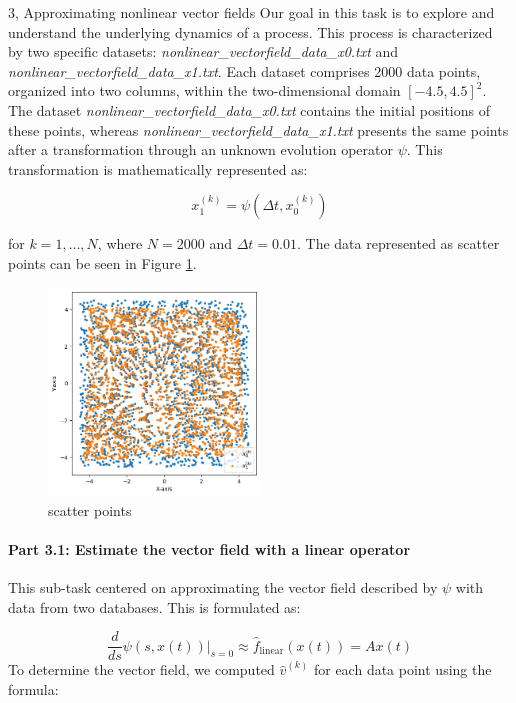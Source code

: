\begin{task}{3, Approximating nonlinear vector fields}
Our goal in this task is to explore and understand the underlying dynamics of a process. This process is characterized by two specific datasets: \textit{nonlinear\_vectorfield\_data\_x0.txt} and \textit{nonlinear\_vectorfield\_data\_x1.txt}. Each dataset comprises 2000 data points, organized into two columns, within the two-dimensional domain \([-4.5, 4.5]^2\). The dataset \textit{nonlinear\_vectorfield\_data\_x0.txt} contains the initial positions of these points, whereas \textit{nonlinear\_vectorfield\_data\_x1.txt} presents the same points after a transformation through an unknown evolution operator \(\psi\). This transformation is mathematically represented as:

\[
x^{(k)}_1 = \psi(\Delta t, x^{(k)}_0)
\]

for \( k = 1, \ldots, N \), where \( N = 2000 \) and \(\Delta t = 0.01\).
The data represented as scatter points can be seen in Figure \ref{fig:3.1}.

\begin{figure}[H]
\centering
\includegraphics[width=0.5\textwidth]{images/nonlinear_vector_fields.png}
\caption{scatter points}
\label{fig:3.1}
\end{figure}

\paragraph{Part 3.1: Estimate the vector field with a linear operator}

This sub-task centered on approximating the vector field described by \(\psi\) with data from two databases. This is formulated as:

\[
\frac{d}{ds} \psi(s, x(t)) \bigg|_{s=0} \approx \hat{f}_{\text{linear}}(x(t)) = Ax(t)
\]
To determine the vector field, we computed \(\hat{v}^{(k)}\) for each data point using the formula:


\end{task}
